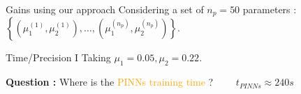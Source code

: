 \begin{frame}{Gains using our approach}	
	Considering a set of $n_p=50$ parameters : $\left\{(\mu_1^{(1)},\mu_2^{(1)}),\dots,(\mu_1^{(n_p)},\mu_2^{(n_p)})\right\}$.
	
	\vspace{5pt}
	
	\hspace{20pt}\begin{minipage}{0.05\linewidth}
		\footnotesize
	\end{minipage}
	\begin{minipage}{0.8\linewidth}
		\centering
	\end{minipage} 

	\vspace{5pt}

	\hspace{20pt}\begin{minipage}{0.05\linewidth}
		\footnotesize
	\end{minipage}
	\begin{minipage}{0.8\linewidth}
		\centering
	\end{minipage} 

	\vspace{5pt}

	\hspace{20pt}\begin{minipage}{0.05\linewidth}
		\footnotesize
	\end{minipage}
	\begin{minipage}{0.8\linewidth}
		\centering
	\end{minipage} 
\end{frame}

\begin{frame}{Time/Precision I}	
	Taking $\mu_1=0.05,\mu_2=0.22$.
	
	\begin{minipage}{0.48\linewidth}
		\centering
	\end{minipage}
	\begin{minipage}{0.48\linewidth}
		\centering
	\end{minipage}

	\vspace{10pt}

	\textbf{Question :} Where is the \textcolor{orange}{PINNs training time} ? $\qquad t_{PINNs}\approx 240s$	 
\end{frame}

